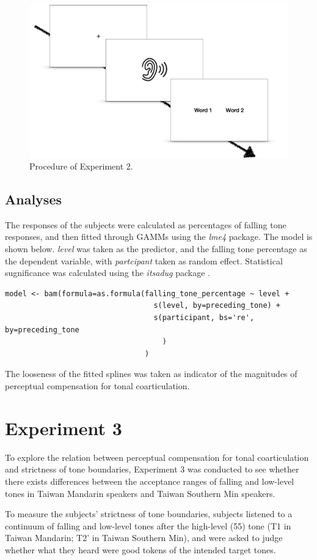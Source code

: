 \begin{figure}[h]
\centering
\includegraphics[width=.7\textwidth]{figures/E2/Procedure.png}
\caption{Procedure of Experiment 2.}
\label{Figure:Experiment2Procedure}
\end{figure}

\subsection{Analyses}
The responses of the subjects were calculated as percentages of falling tone responses, and then fitted through GAMMs using the \textit{lme4} package. The model is shown below. \textit{level} was taken as the predictor, and the falling tone percentage as the dependent variable, with \textit{partcipant} taken as random effect. Statistical sugnificance was calculated using the \textit{itsadug} package \citep{vanRijetal2020}.
\begin{lstlisting}
model <- bam(formula=as.formula(falling_tone_percentage ~ level + 
                                  s(level, by=preceding_tone) + 
                                  s(participant, bs='re', by=preceding_tone
                                    )
                                )
\end{lstlisting}
The looseness of the fitted splines was taken as indicator of the magnitudes of perceptual compensation for tonal coarticulation.

\section{Experiment 3}\label{section:Experiment3}
To explore the relation between perceptual compensation for tonal coarticulation and strictness of tone boundaries, Experiment 3 was conducted to see whether there exists differences between the acceptance ranges of falling and low-level tones in Taiwan Mandarin speakers and Taiwan Southern Min speakers.

To measure the subjects' strictness of tone boundaries, subjects listened to a continuum of falling and low-level tones after the high-level (55) tone (T1 in Taiwan Mandarin; T2' in Taiwan Southern Min), and were asked to judge whether what they heard were good tokens of the intended target tones.

